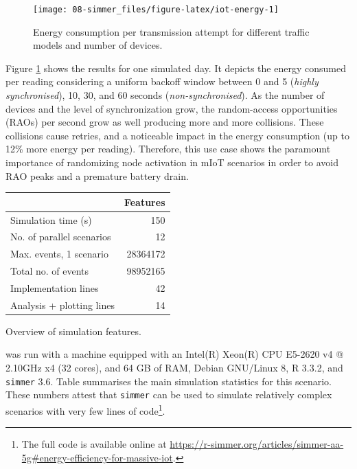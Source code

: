 \documentclass[twoside,nohyper]{tufte-book}
\begin{document}
\begin{figure}

{\centering \texttt{[image: 08-simmer\_files/figure-latex/iot-energy-1]} 

}

\caption[Energy consumption per transmission attempt for different traffic models and number of devices.]{Energy consumption per transmission attempt for different traffic models and number of devices.}\label{fig:iot-energy}
\end{figure}

Figure \ref{fig:iot-energy} shows the results for one simulated day. It depicts the energy consumed per reading considering a uniform backoff window between 0 and 5 (\emph{highly synchronised}), 10, 30, and 60 seconds (\emph{non-synchronised}). As the number of devices and the level of synchronization grow, the random-access opportunities (RAOs) per second grow as well producing more and more collisions. These collisions cause retries, and a noticeable impact in the energy consumption (up to 12\% more energy per reading). Therefore, this use case shows the paramount importance of randomizing node activation in mIoT scenarios in order to avoid RAO peaks and a premature battery drain.

\begin{margintable}[-20mm]

\begin{center}
\begin{tabular}{lr}
\toprule
  & Features\\
\midrule
Simulation time (s) & 150\\
No. of parallel scenarios & 12\\
Max. events, 1 scenario & 28364172\\
Total no. of events & 98952165\\
Implementation lines & 42\\
\addlinespace
Analysis + plotting lines & 14\\
\bottomrule
\end{tabular}
\end{center}
\caption{\label{tab:simulation-overview}Overview of simulation features.}
\end{margintable}

 was run with a machine equipped with an Intel(R) Xeon(R) CPU E5-2620 v4 @ 2.10GHz x4 (32 cores), and 64 GB of RAM, Debian GNU/Linux 8, R 3.3.2, and \texttt{simmer} 3.6. Table summarises the main simulation statistics for this scenario. These numbers attest that \texttt{simmer} can be used to simulate relatively complex scenarios with very few lines of code\footnote{The full code is available online at \url{https://r-simmer.org/articles/simmer-aa-5g\#energy-efficiency-for-massive-iot}.}.
\end{document}
